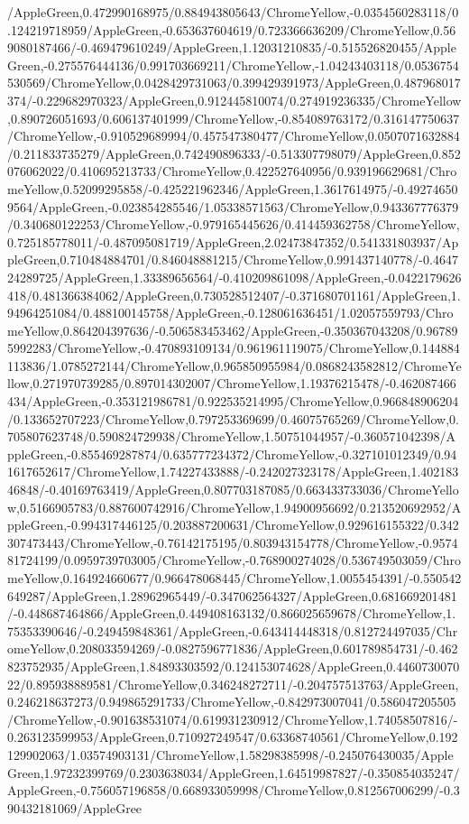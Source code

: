 {\begin{tikzternal}
/AppleGreen,0.472990168975/0.884943805643/ChromeYellow,-0.0354560283118/0.124219718959/AppleGreen,-0.653637604619/0.723366636209/ChromeYellow,0.569080187466/-0.469479610249/AppleGreen,1.12031210835/-0.515526820455/AppleGreen,-0.275576444136/0.991703669211/ChromeYellow,-1.04243403118/0.0536754530569/ChromeYellow,0.0428429731063/0.399429391973/AppleGreen,0.487968017374/-0.229682970323/AppleGreen,0.912445810074/0.274919236335/ChromeYellow,0.890726051693/0.606137401999/ChromeYellow,-0.854089763172/0.316147750637/ChromeYellow,-0.910529689994/0.457547380477/ChromeYellow,0.0507071632884/0.211833735279/AppleGreen,0.742490896333/-0.513307798079/AppleGreen,0.852076062022/0.410695213733/ChromeYellow,0.422527640956/0.939196629681/ChromeYellow,0.52099295858/-0.425221962346/AppleGreen,1.3617614975/-0.492746509564/AppleGreen,-0.023854285546/1.05338571563/ChromeYellow,0.943367776379/0.340680122253/ChromeYellow,-0.979165445626/0.414459362758/ChromeYellow,0.725185778011/-0.487095081719/AppleGreen,2.02473847352/0.541331803937/AppleGreen,0.710484884701/0.846048881215/ChromeYellow,0.991437140778/-0.464724289725/AppleGreen,1.33389656564/-0.410209861098/AppleGreen,-0.0422179626418/0.481366384062/AppleGreen,0.730528512407/-0.371680701161/AppleGreen,1.94964251084/0.488100145758/AppleGreen,-0.128061636451/1.02057559793/ChromeYellow,0.864204397636/-0.506583453462/AppleGreen,-0.350367043208/0.967895992283/ChromeYellow,-0.470893109134/0.961961119075/ChromeYellow,0.144884113836/1.0785272144/ChromeYellow,0.965850955984/0.0868243582812/ChromeYellow,0.271970739285/0.897014302007/ChromeYellow,1.19376215478/-0.462087466434/AppleGreen,-0.353121986781/0.922535214995/ChromeYellow,0.966848906204/0.133652707223/ChromeYellow,0.797253369699/0.46075765269/ChromeYellow,0.705807623748/0.590824729938/ChromeYellow,1.50751044957/-0.360571042398/AppleGreen,-0.855469287874/0.635777234372/ChromeYellow,-0.327101012349/0.941617652617/ChromeYellow,1.74227433888/-0.242027323178/AppleGreen,1.40218346848/-0.40169763419/AppleGreen,0.807703187085/0.663433733036/ChromeYellow,0.5166905783/0.887600742916/ChromeYellow,1.94900956692/0.213520692952/AppleGreen,-0.994317446125/0.203887200631/ChromeYellow,0.929616155322/0.342307473443/ChromeYellow,-0.76142175195/0.803943154778/ChromeYellow,-0.957481724199/0.0959739703005/ChromeYellow,-0.768900274028/0.536749503059/ChromeYellow,0.164924660677/0.966478068445/ChromeYellow,1.0055454391/-0.550542649287/AppleGreen,1.28962965449/-0.347062564327/AppleGreen,0.681669201481/-0.448687464866/AppleGreen,0.449408163132/0.866025659678/ChromeYellow,1.75353390646/-0.249459848361/AppleGreen,-0.643414448318/0.812724497035/ChromeYellow,0.208033594269/-0.0827596771836/AppleGreen,0.601789854731/-0.462823752935/AppleGreen,1.84893303592/0.124153074628/AppleGreen,0.446073007022/0.895938889581/ChromeYellow,0.346248272711/-0.204757513763/AppleGreen,0.246218637273/0.949865291733/ChromeYellow,-0.842973007041/0.586047205505/ChromeYellow,-0.901638531074/0.619931230912/ChromeYellow,1.74058507816/-0.263123599953/AppleGreen,0.710927249547/0.63368740561/ChromeYellow,0.192129902063/1.03574903131/ChromeYellow,1.58298385998/-0.245076430035/AppleGreen,1.97232399769/0.2303638034/AppleGreen,1.64519987827/-0.350854035247/AppleGreen,-0.756057196858/0.668933059998/ChromeYellow,0.812567006299/-0.390432181069/AppleGree
\end{tikzternal}}
